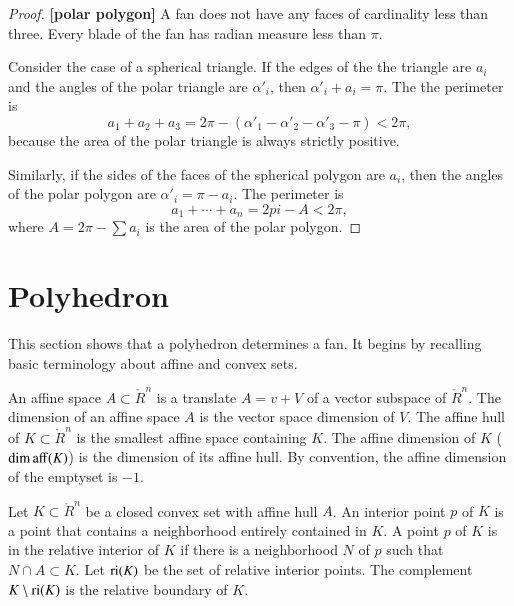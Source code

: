\begin{proof} {\bf [polar polygon]} A fan does not have any faces of cardinality less than three.
Every blade of the fan has radian measure less than $\pi$.  

Consider the case of a spherical triangle.  If the edges of the
the triangle are $a_i$ and the angles of the polar
triangle are $\alpha'_i$, then $\alpha'_i+a_i=\pi$.
The the perimeter is 
$$a_1+a_2+a_3 = 2\pi - (\alpha'_1 -\alpha'_2 - \alpha'_3-\pi) < 2\pi,$$
because the area of the polar triangle is always strictly positive.

Similarly, if the sides of the faces of the spherical polygon are
$a_i$, then the angles of the polar polygon are $\alpha'_i = \pi-a_i$.
The perimeter is
$$
a_1+\cdots+a_n  = 2pi- A< 2\pi,
$$
where $A = 2\pi-\sum a_i$ is the area of the polar polygon.
\end{proof}



\section{Polyhedron}

This section shows that a polyhedron determines a fan.  It begins by recalling basic terminology about affine and convex sets.


An affine space $A\subset\ring{R}^n$ is a translate $A=v + V$ of
a vector subspace of $\ring{R}^n$.  The dimension of an affine space $A$
is the vector space dimension of $V$.  The
affine hull of $K\subset\ring{R}^n$ is the smallest affine space containing $K$.  The affine dimension of $K$ ($\operatorname{dim\,aff}(K)$) is the dimension of its affine hull.  By convention, the affine dimension of the emptyset is $-1$.

\begin{definition} Let $K\subset\ring{R}^n$ be a closed convex set with affine hull $A$.   An interior point $p$ of $K$ is a point that contains a neighborhood entirely contained in $K$.  A point $p$ of $K$ is in the relative interior of $K$ if there is a neighborhood $N$ of $p$ such that $N\cap A\subset K$.  Let ${\operatorname{ri}}(K)$ be the set of relative interior points.  The complement $K\setminus {\operatorname{ri}}(K)$ is the relative boundary of $K$.
\end{definition}

